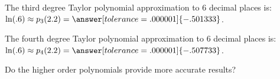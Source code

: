 \documentclass{ximera}
\begin{document}
\begin{exercise}
\begin{exercise}
\begin{exercise}
The third degree Taylor polynomial approximation to 6 decimal places is: $\ln(.6) \approx p_3(2.2) = \answer[tolerance=.000001]{-.501333}$.

The fourth degree Taylor polynomial approximation to 6 decimal places is: $\ln(.6) \approx p_4(2.2) = \answer[tolerance=.000001]{-.507733}$.

Do the higher order polynomials provide more accurate results?

\begin{multipleChoice}
\end{multipleChoice}
\end{exercise}
\end{exercise}

\end{exercise}
\end{document}
